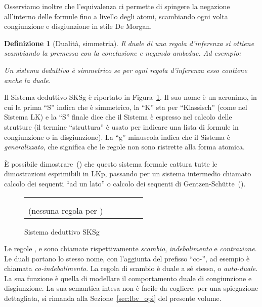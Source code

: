 \documentclass[12pt,a4paper,openright,twoside]{report}
\newtheorem{dfn}[thm]{Definizione}
\begin{document}
Osserviamo inoltre che l'equivalenza ci permette di spingere la negazione all'interno delle formule fino a livello degli atomi, scambiando ogni volta congiunzione e disgiunzione in stile De Morgan.

\begin{dfn}[Dualit\`a, simmetria]
Il \emph{duale di una regola} d'inferenza si ottiene scambiando la premessa con la conclusione e negando ambedue. Ad esempio:


Un \emph{sistema deduttivo} \`e \emph{simmetrico} se per ogni regola d'inferenza esso contiene anche la duale.
\end{dfn}

Il Sistema deduttivo \textsf{SKSg} \`e riportato in Figura~\ref{fig:sksg_cos}. Il suo nome \`e un acronimo, in cui la prima ``S'' indica che \`e simmetrico, la ``K'' sta per ``Klassisch'' (come nel Sistema \textsf{LK}) e la ``S'' finale dice che il Sistema \`e espresso nel calcolo delle strutture (il termine ``struttura'' \`e usato per indicare una lista di formule in congiunzione o in disgiunzione). La ``g'' minuscola indica che il Sistema \`e \emph{generalizzato}, che significa che le regole non sono ristrette alla forma atomica.

\`E possibile dimostrare~(\cite{Bru04}) che questo sistema formale cattura tutte le dimostrazioni esprimibili in \textsf{LKp}, passando per un sistema intermedio chiamato calcolo dei sequenti ``ad un lato'' o calcolo dei sequenti di Gentzen-Sch\"utte~(\cite{Sch50, TroSch96}).

\begin{figure}
\begin{tabular}{ccccc}
	 &
	 & 
	 &
	 &
	 \\\\
	\begin{minipage}[c]{6em}\centering(nessuna regola per )\end{minipage} &
	 &
	 &
	 &
	~
\end{tabular}
\caption{Sistema deduttivo \textsf{SKSg}}
\label{fig:sksg_cos}
\end{figure}

Le regole ,  e  sono chiamate rispettivamente \emph{scambio}, \emph{indebolimento} e \emph{contrazione}. Le duali portano lo stesso nome, con l'aggiunta del prefisso ``co-'', ad esempio  \`e chiamata \emph{co-indebolimento}. La regola di scambio \`e duale a s\'e stessa, o \emph{auto-duale}. La sua funzione \`e quella di modellare il comportamento duale di congiunzione e disgiunzione. La sua semantica intesa non \`e facile da cogliere: per una spiegazione dettagliata, si rimanda alla Sezione~\ref{sec:lbv_opi} del presente volume.
\end{document}
